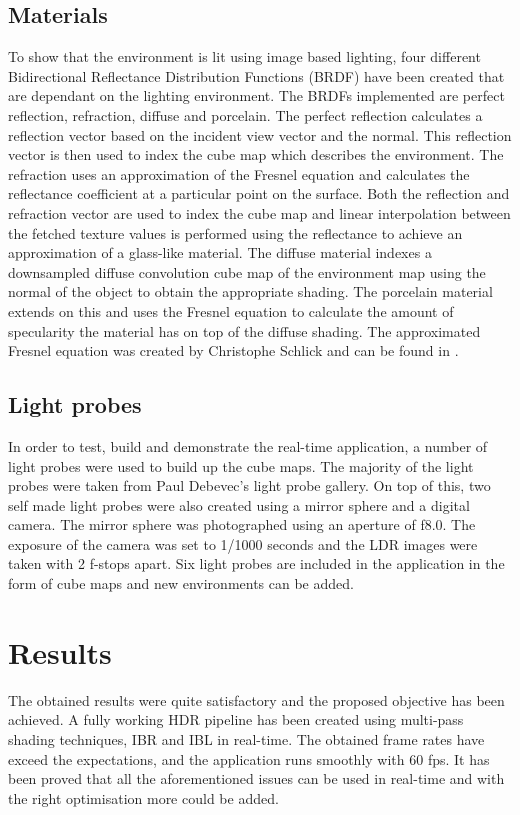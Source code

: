 \documentclass[twocolumn,8pt]{article}
\begin{document}
\subsection{Materials}
To show that the environment is lit using image based lighting, four different Bidirectional Reflectance Distribution Functions (BRDF) have been created that are dependant on the lighting environment. The BRDFs implemented are perfect reflection, refraction, diffuse and porcelain. The perfect reflection calculates a reflection vector based on the incident view vector and the normal. This reflection vector is then used to index the cube map which describes the environment. The refraction uses an approximation of the Fresnel equation and calculates the reflectance coefficient at a particular point on the surface. Both the reflection and refraction vector are used to index the cube map and linear interpolation between the fetched texture values is performed using the reflectance to achieve an approximation of a glass-like material. The diffuse material indexes a downsampled diffuse convolution cube map of the environment map using the normal of the object to obtain the appropriate shading. The porcelain material extends on this and uses the Fresnel equation to calculate the amount of specularity the material has on top of the diffuse shading. The approximated Fresnel equation was created by Christophe Schlick and can be found in \cite{opengl-orange-book}.

\subsection{Light probes}
In order to test, build and demonstrate the real-time application, a number of light probes were used to build up the cube maps. The majority of the light probes were taken from Paul Debevec's light probe gallery. On top of this, two self made light probes were also created using a mirror sphere and a digital camera. The mirror sphere was photographed using an aperture of f8.0. The exposure of the camera was set to 1/1000 seconds and the LDR images were taken with 2 f-stops apart. Six light probes are included in the application in the form of cube maps and new environments can be added.

\section{Results}
The obtained results were quite satisfactory and the proposed objective has been achieved. A fully working HDR pipeline has been created using multi-pass shading techniques, IBR and IBL in real-time. The obtained frame rates have exceed the expectations, and the application runs smoothly with 60 fps. It has been proved that all the aforementioned issues can be used in real-time and with the right optimisation more could be added.
\end{document}
